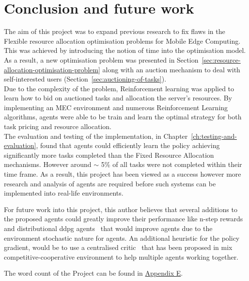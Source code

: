 \chapter{Conclusion and future work}
\label{ch:conclusion-and-future-work}
The aim of this project was to expand previous research to fix flaws in the Flexible resource allocation optimisation
problems for Mobile Edge Computing. This was achieved by introducing the notion of time into the optimisation
model. As a result, a new optimisation problem was presented in Section~\ref{sec:resource-allocation-optimisation-problem}
along with an auction mechanism to deal with self-interested users (Section~\ref{sec:auctioning-of-tasks}). \\
Due to the complexity of the problem, Reinforcement learning was applied to learn how to bid on auctioned tasks and
allocation the server's resources. By implementing an MEC environment and numerous Reinforcement Learning algorithms,
agents were able to be train and learn the optimal strategy for both task pricing and resource allocation. \\
The evaluation and testing of the implementation, in Chapter~\ref{ch:testing-and-evaluation}, found that agents could
efficiently learn the policy achieving significantly more tasks completed than the Fixed Resource Allocation mechanisms.
However around $\sim$ 5\% of all tasks were not completed within their time frame. As a result, this project has been
viewed as a success however more research and analysis of agents are required before such systems
can be implemented into real-life environments.

For future work into this project, this author believes that several additions to the proposed agents could greatly
improve their performance like n-step rewards~\citep{multi-step-dqn} and distributional ddpg
agents~\citep{distributional_dqn, d4pg} that would improve agents due to the environment stochastic nature for agents. An
additional heuristic for the policy gradient, would be to use a centralised critic~\citep{maddpg} that has been proposed
in mix competitive-cooperative environment to help multiple agents working together.

The word count of the Project can be found in \hyperref[app:project-management]{Appendix E}.
